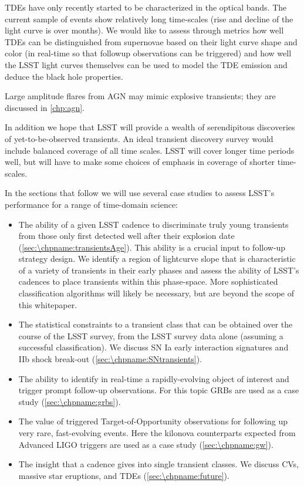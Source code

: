 TDEs have only recently started to be characterized in the optical
bands. The current sample of events show relatively long
time-scales (rise and decline of the light curve is over months). We
would like to assess through metrics how well TDEs can be
distinguished from supernovae based on their light curve shape and
color (in real-time so that followup observations can be triggered)
and how well the LSST light curves themselves can be used to model the
TDE emission and deduce the black hole properties.

Large amplitude flares from AGN may mimic
explosive transients; they are discussed in \autoref{chp:agn}.

In addition we hope that LSST will provide a wealth of serendipitous
discoveries of yet-to-be-observed transients.  An ideal transient
discovery survey would include balanced coverage of all time scales. LSST
will cover longer time periods well, but will have to make some
choices of emphasis in coverage of shorter time-scales.

In the sections that follow we will use several case studies to assess
LSST's performance for a range of time-domain science:

\begin{itemize}
\item
  The ability of a given LSST cadence to discriminate truly young
  transients from those only first detected well after their explosion date (\autoref{sec:\chpname:transientsAge}).
  This ability is a crucial input to follow-up strategy design.
  We identify a region of lightcurve slope
  that is characteristic of a
  variety of transients in their early phases and assess the ability of LSST's
  cadences to place transients within this phase-space.
  More sophisticated classification algorithms will likely be necessary, but
  are beyond the scope of this whitepaper.
\item
  The statistical constraints to a transient class that can be obtained
  over the course of the LSST survey, from the LSST survey data alone
  (assuming a successful classification). We discuss SN Ia early interaction
  signatures and IIb shock break-out (\autoref{sec:\chpname:SNtransients}).
\item
  The ability to identify in real-time a rapidly-evolving
  object of interest and
  trigger prompt follow-up observations. For this topic GRBs are used as
  a case study (\autoref{sec:\chpname:grbs}).
\item
  The value of triggered Target-of-Opportunity observations for
  following up very rare, fast-evolving events.   Here the kilonova
  counterparts expected from Advanced LIGO triggers are used as a
  case study (\autoref{sec:\chpname:gw}).
\item
  The insight that a cadence gives into single transient classes. We
  discuss CVs, massive star eruptions, and TDEs (\autoref{sec:\chpname:future}).

\end{itemize}


